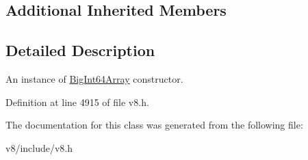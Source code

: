 \subsection*{Additional Inherited Members}


\subsection{Detailed Description}
An instance of \mbox{\hyperlink{classv8_1_1BigInt64Array}{Big\+Int64\+Array}} constructor. 

Definition at line 4915 of file v8.\+h.



The documentation for this class was generated from the following file\+:\begin{DoxyCompactItemize}
\item 
v8/include/v8.\+h\end{DoxyCompactItemize}
